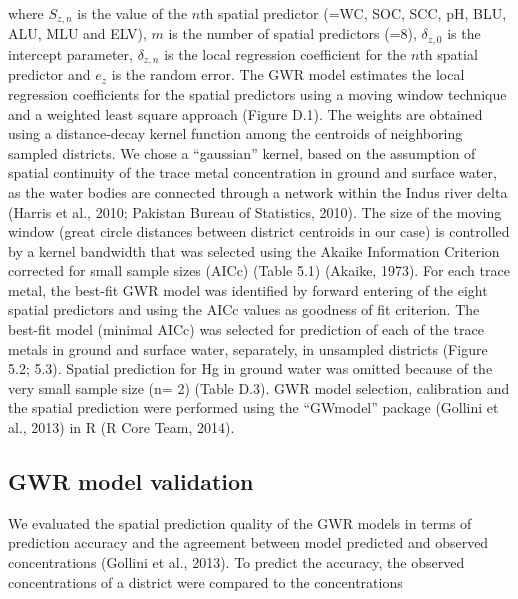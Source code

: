 where $S_{z,n}$ is the value of the $n$th spatial predictor (={WC, SOC, SCC, pH, BLU, ALU, MLU and ELV}), $m$ is the number of spatial predictors (=8), $\delta_{z,0}$ is the intercept parameter, $\delta_{z,n}$ is the local regression coefficient for the $n$th spatial predictor and $e_z$ is the random error. The GWR model estimates the local regression coefficients for the spatial predictors using a moving window technique and a weighted least square approach (Figure D.1). The weights are obtained using a distance-decay kernel function among the centroids of neighboring sampled districts. We chose a “gaussian” kernel, based on the assumption of spatial continuity of the trace metal concentration in ground and surface water, as the water bodies are connected through a network within the Indus river delta (Harris et al., 2010; Pakistan Bureau of Statistics, 2010). The size of the moving window (great circle distances between district centroids in our case) is controlled by a kernel bandwidth that was selected using the Akaike Information Criterion corrected for small sample sizes (AICc) (Table 5.1) (Akaike, 1973). For each trace metal, the best-fit GWR model was identified by forward entering of the eight spatial predictors and using the AICc values as goodness of fit criterion. The best-fit model (minimal AICc) was selected for prediction of each of the trace metals in ground and surface water, separately, in unsampled districts (Figure 5.2; 5.3). Spatial prediction for Hg in ground water was omitted because of the very small sample size (n= 2) (Table D.3). GWR model selection, calibration and the spatial prediction were performed using the “GWmodel” package (Gollini et al., 2013) in R (R Core Team, 2014).

\subsection{GWR model validation}
\label{GWR model validation}

We evaluated the spatial prediction quality of the GWR models in terms of prediction accuracy and the agreement between model predicted and observed concentrations (Gollini et al., 2013). To predict the accuracy, the observed concentrations of a district were compared to the concentrations

